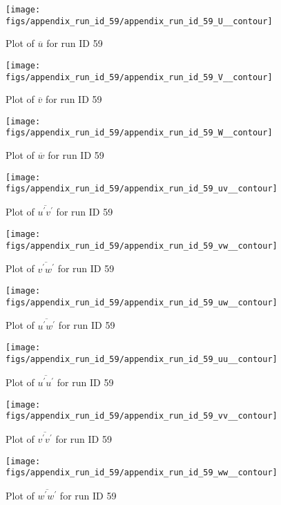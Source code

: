 \begin{figure}[H]
\centering
\texttt{[image: figs/appendix\_run\_id\_59/appendix\_run\_id\_59\_U\_\_contour]}
\caption{Plot of $\overline{u}$ for run ID 59}
\label{fig:appendix_run_id_59_U__contour}
\end{figure}


\begin{figure}[H]
\centering
\texttt{[image: figs/appendix\_run\_id\_59/appendix\_run\_id\_59\_V\_\_contour]}
\caption{Plot of $\overline{v}$ for run ID 59}
\label{fig:appendix_run_id_59_V__contour}
\end{figure}


\begin{figure}[H]
\centering
\texttt{[image: figs/appendix\_run\_id\_59/appendix\_run\_id\_59\_W\_\_contour]}
\caption{Plot of $\overline{w}$ for run ID 59}
\label{fig:appendix_run_id_59_W__contour}
\end{figure}


\begin{figure}[H]
\centering
\texttt{[image: figs/appendix\_run\_id\_59/appendix\_run\_id\_59\_uv\_\_contour]}
\caption{Plot of $\overline{u^\prime v^\prime}$ for run ID 59}
\label{fig:appendix_run_id_59_uv__contour}
\end{figure}


\begin{figure}[H]
\centering
\texttt{[image: figs/appendix\_run\_id\_59/appendix\_run\_id\_59\_vw\_\_contour]}
\caption{Plot of $\overline{v^\prime w^\prime}$ for run ID 59}
\label{fig:appendix_run_id_59_vw__contour}
\end{figure}


\begin{figure}[H]
\centering
\texttt{[image: figs/appendix\_run\_id\_59/appendix\_run\_id\_59\_uw\_\_contour]}
\caption{Plot of $\overline{u^\prime w^\prime}$ for run ID 59}
\label{fig:appendix_run_id_59_uw__contour}
\end{figure}


\begin{figure}[H]
\centering
\texttt{[image: figs/appendix\_run\_id\_59/appendix\_run\_id\_59\_uu\_\_contour]}
\caption{Plot of $\overline{u^\prime u^\prime}$ for run ID 59}
\label{fig:appendix_run_id_59_uu__contour}
\end{figure}


\begin{figure}[H]
\centering
\texttt{[image: figs/appendix\_run\_id\_59/appendix\_run\_id\_59\_vv\_\_contour]}
\caption{Plot of $\overline{v^\prime v^\prime}$ for run ID 59}
\label{fig:appendix_run_id_59_vv__contour}
\end{figure}


\begin{figure}[H]
\centering
\texttt{[image: figs/appendix\_run\_id\_59/appendix\_run\_id\_59\_ww\_\_contour]}
\caption{Plot of $\overline{w^\prime w^\prime}$ for run ID 59}
\label{fig:appendix_run_id_59_ww__contour}
\end{figure}


